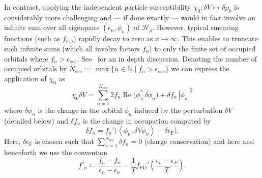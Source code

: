 \documentclass[hidelinks,onefignum,onetabnum]{siamart250211}
\newcommand{\N}{\mathbb{N}}
\newcommand{\Real}{\operatorname{Re}}
\newcommand{\Nocc}{N_{\mathrm{occ}}}
\newcommand{\fFD}{f_{\mathrm{FD}}}
\newcommand{\epsilonF}{\epsilon_{\mathrm{F}}}
\newcommand{\braket}[2]{\left\langle #1, #2 \right\rangle}
\newcommand{\Hrho}{\mathcal{H}_\rho}
\begin{document}
In contrast, applying the independent particle
susceptibility $\chi_0 : \delta V \mapsto \delta\rho_0$ is considerably
more challenging
and --- if done exactly --- would in fact involve an infinite
sum over all eigenpairs $(\epsilon_n, \phi_n)$ of $\Hrho$.
%
%
%
However, typical smearing functions (such as $\fFD$) rapidly decay
to zero as $x\to\infty$.
This enables to truncate such infinite sums (which all involve factors $f_n$)
to only the finite set of occupied orbitals where $f_n > \epsilon_{\mathrm{occ}}$.
See~\cite{cances2023numerical} for an in depth discussion.
Denoting the number of occupied orbitals
by $\Nocc := \max\{n \in \N \mid f_n > \epsilon_{\mathrm{occ}}\}$
we can express the application of $\chi_0$ as
\begin{equation}\label{eq:chi0}
  \chi_0 \delta V
    = \sum_{n=1}^{\Nocc} 2 f_n \Real \big( \phi_n^* \, \delta \phi_n \big) + \delta f_n \, \left| \phi_n \right|^2
\end{equation}
where $\delta \phi_n$ is the change in the orbital $\phi_n$
induced by the perturbation $\delta V$ (detailed below)
and $\delta f_n$ is the change in occupation computed by
\begin{equation}\label{eq:delta_f}
    \delta f_n = f_n' \Big( \braket{\phi_n}{\delta V \phi_n} - \delta \epsilonF \Big).
\end{equation}
Here, $\delta \epsilonF$ is chosen such that $\sum_{n=1}^{\Nocc} \delta f_n = 0$
(charge conservation) and here and henceforth we use the convention
\begin{equation}\label{eq:fprime}
    f'_n \coloneqq \frac{f_n - f_n}{\epsilon_n - \epsilon_n} = \frac{1}{T}\fFD'\left(\frac{\epsilon_n - \epsilon_F}{T}\right).
\end{equation}

%
%
%
%
%
%
%
%
%
%
%
%
%
%
%
%
%
%
%
%
%
%
%
%
%
%

%
%
%
%
%
%
%
%
%
%
%
%
%
%
%
%
%
%
%
%
%
%
%
%
%
%
%
%
%
%
%
%
%
%
%
%
%
%
%
%
\end{document}
